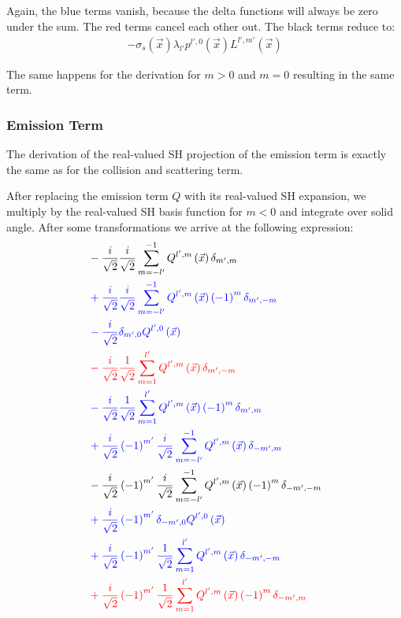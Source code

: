 \documentclass[10pt]{scrartcl}
\begin{document}
Again, the blue terms vanish, because the delta functions will always be zero under the sum. The red terms cancel each other out. The black terms reduce to:
\begin{align*}
-\sigma_s\left(\vec{x}\right)\lambda_{l'}p^{l',0}\left(\vec{x}\right)L^{l',m'}\left(\vec{x}\right)
\end{align*}

The same happens for the derivation for $m>0$ and $m=0$ resulting in the same term.

\subsubsection{Emission Term}

The derivation of the real-valued SH projection of the emission term is exactly the same as for the collision and scattering term.

After replacing the emission term $Q$ with its real-valued SH expansion, we multiply by the real-valued SH basis function for $m<0$ and integrate over solid angle. After some transformations we arrive at the following expression:
\begin{align*}
&
-\frac{i}{\sqrt{2}}\frac{i}{\sqrt{2}}\sum_{m=-l'}^{-1}{Q^{{l',m}}\left (\vec{x} \right )\delta_{m',m}}
\\&
\mathcolor{blue}
{
+\frac{i}{\sqrt{2}}\frac{i}{\sqrt{2}}\sum_{m=-l'}^{-1}{Q^{{l',m}}\left (\vec{x} \right )\left({-1}\right)^{m}\delta_{m',-m}}
}
\\&
\mathcolor{blue}
{
-\frac{i}{\sqrt{2}}\delta_{m',0}Q^{{l',0}}\left (\vec{x} \right )
}
\\&
\mathcolor{red}
{
-\frac{i}{\sqrt{2}}\frac{1}{\sqrt{2}}\sum_{m=1}^{l'}{Q^{{l',m}}\left (\vec{x} \right )\delta_{m',-m}}
}
\\&
\mathcolor{blue}
{
-\frac{i}{\sqrt{2}}\frac{1}{\sqrt{2}}\sum_{m=1}^{l'}{Q^{{l',m}}\left (\vec{x} \right )\left({-1}\right)^{m}\delta_{m',m}}
}
\\&
\mathcolor{blue}
{
+\frac{i}{\sqrt{2}}\left({-1}\right)^{m'}\frac{i}{\sqrt{2}}\sum_{m=-l'}^{-1}{Q^{{l',m}}\left (\vec{x} \right )\delta_{-m',m}}
}
\\&
-\frac{i}{\sqrt{2}}\left({-1}\right)^{m'}\frac{i}{\sqrt{2}}\sum_{m=-l'}^{-1}{Q^{{l',m}}\left (\vec{x} \right )\left({-1}\right)^{m}\delta_{-m',-m}}
\\&
\mathcolor{blue}
{
+\frac{i}{\sqrt{2}}\left({-1}\right)^{m'}\delta_{-m',0}Q^{{l',0}}\left (\vec{x} \right )
}
\\&
\mathcolor{blue}
{
+\frac{i}{\sqrt{2}}\left({-1}\right)^{m'}\frac{1}{\sqrt{2}}\sum_{m=1}^{l'}{Q^{{l',m}}\left (\vec{x} \right )\delta_{-m',-m}}
}
\\&
\mathcolor{red}
{
+\frac{i}{\sqrt{2}}\left({-1}\right)^{m'}\frac{1}{\sqrt{2}}\sum_{m=1}^{l'}{Q^{{l',m}}\left (\vec{x} \right )\left({-1}\right)^{m}\delta_{-m',m}}
}
\end{align*}
\end{document}
